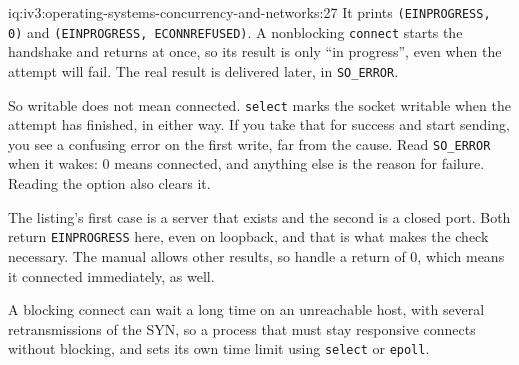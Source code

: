 \begin{solution}{iq:iv3:operating-systems-concurrency-and-networks:27}
It prints \texttt{(\textquotesingle{}EINPROGRESS\textquotesingle{}, 0)} and \texttt{(\textquotesingle{}EINPROGRESS\textquotesingle{}, \textquotesingle{}ECONNREFUSED\textquotesingle{})}. A nonblocking \texttt{connect} starts the handshake and returns at once, so its result is only ``in progress'', even when the attempt will fail. The real result is delivered later, in \texttt{SO\_ERROR}.

So writable does not mean connected. \texttt{select} marks the socket writable when the attempt has finished, in either way. If you take that for success and start sending, you see a confusing error on the first write, far from the cause. Read \texttt{SO\_ERROR} when it wakes: 0 means connected, and anything else is the reason for failure. Reading the option also clears it.

The listing's first case is a server that exists and the second is a closed port. Both return \texttt{EINPROGRESS} here, even on loopback, and that is what makes the check necessary. The manual allows other results, so handle a return of 0, which means it connected immediately, as well.

A blocking connect can wait a long time on an unreachable host, with several retransmissions of the SYN, so a process that must stay responsive connects without blocking, and sets its own time limit using \texttt{select} or \texttt{epoll}.

\end{solution}

